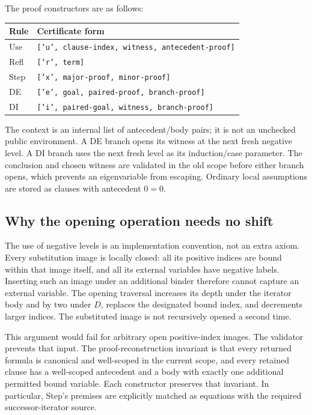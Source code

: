 The proof constructors are as follows:
\begin{center}
\begin{tabular}{ll}
\toprule
Rule & Certificate form\\
\midrule
Use & \texttt{['u', clause-index, witness, antecedent-proof]}\\
Refl & \texttt{['r', term]}\\
Step & \texttt{['x', major-proof, minor-proof]}\\
DE & \texttt{['e', goal, paired-proof, branch-proof]}\\
DI & \texttt{['i', paired-goal, witness, branch-proof]}\\
\bottomrule
\end{tabular}
\end{center}

The context is an internal list of antecedent/body pairs; it is not
an unchecked public environment. A DE branch opens its witness at
the next fresh negative level. A DI branch uses the next fresh level
as its induction/case parameter. The conclusion and chosen witness are
validated in the old scope before either branch opens, which prevents
an eigenvariable from escaping. Ordinary local assumptions are stored
as clauses with antecedent \(0=0\).

\subsection{Why the opening operation needs no shift}

The use of negative levels is an implementation convention, not an
extra axiom. Every substitution image is locally closed: all its
positive indices are bound within that image itself, and all its
external variables have negative labels. Inserting such an image
under an additional binder therefore cannot capture an external
variable. The opening traversal increases its depth under the
iterator body and by two under \(D\), replaces the designated bound
index, and decrements larger indices. The substituted image is not
recursively opened a second time.

This argument would fail for arbitrary open positive-index images.
The validator prevents that input. The proof-reconstruction invariant is
that every returned formula is canonical and well-scoped in the current
scope, and every retained clause has a well-scoped antecedent and a
body with exactly one additional permitted bound variable. Each
constructor preserves that invariant. In particular, Step's
premises are explicitly matched as equations with the required
successor-iterator source.

